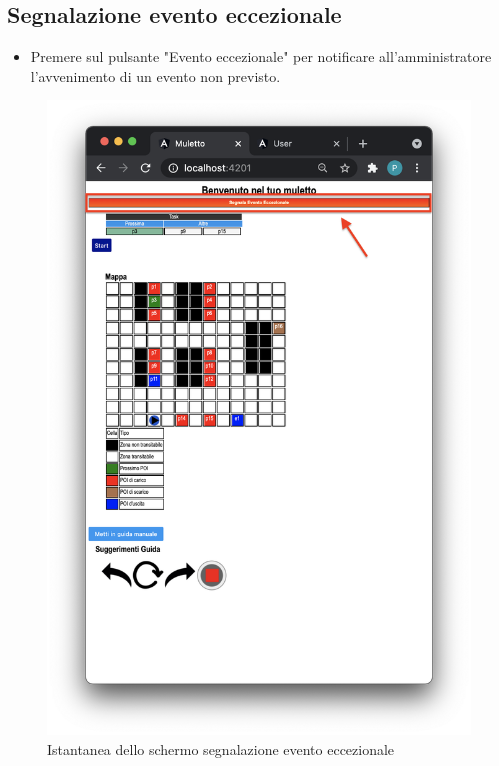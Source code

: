 \subsection{Segnalazione evento eccezionale}
\begin{itemize}
    \item Premere sul pulsante "Evento eccezionale" per notificare all'amministratore l'avvenimento di un evento non previsto.
\end{itemize}
\begin{figure}[H]
    \centering
    \includegraphics[scale=0.45]{res/images/forklift_evento.png}
    \caption{Istantanea dello schermo segnalazione evento eccezionale}
\end{figure}